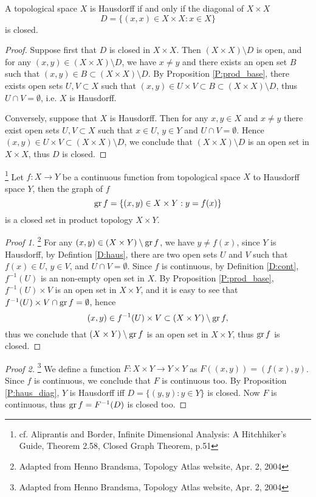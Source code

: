 \begin{proposition} \label{P:haus_diag}
A topological space $X$ is Hausdorff if and only if the diagonal of $X\times X$
\[
	D= \{ (x,x)\in X\times X: x\in X \}
\]
is closed.
\end{proposition}
\begin{proof}
Suppose first that $D$ is closed in $X\times X$. Then $(X\times X)\setminus D$
is open, and for any $(x,y)\in (X\times X)\setminus D$, we have $x\neq y$ and
there exists an open set $B$ such that 
$(x,y)\in B \subset (X\times X)\setminus D$. By Proposition
\ref{P:prod_base}, there exists open sets $U,V\subset X$ such that
$(x,y)\in U\times V \subset B \subset (X\times X)\setminus D$, thus 
$U\cap V=\emptyset$, i.e. $X$ is Hausdorff.

Conversely, suppose that $X$ is Hausdorff. Then for any $x,y\in X$ and $x\neq y$
there exist open sets $U,V\subset X$ such that $x\in U$, $y\in Y$ and 
$U\cap V=\emptyset$. Hence $(x,y)\in U\times V \subset (X\times X)\setminus D$,
we conclude that $(X\times X)\setminus D$ is an open set in $X\times X$, thus
$D$ is closed.
\end{proof}

\begin{lemma} \label{L:haus_graph}
\footnote{cf. Aliprantis and Border, Infinite Dimensional Analysis: A 
	  Hitchhiker's Guide, Theorem 2.58, Closed Graph Theorem, p.51}
Let $f:X\to Y$ be a continuous function from topological space $X$ to Hausdorff 
space $Y$, then the graph of $f$
\[
  \operatorname*{gr} f = \{ (x,y)\in X\times Y : y=f(x) \}
\]
is a closed set in product topology $X\times Y$.
\end{lemma}
\begin{proof}[Proof 1]
\footnote{Adapted from Henno Brandsma, Topology Atlas website, Apr. 2, 2004}
For any $(x,y)\in (X\times Y) \setminus \operatorname*{gr} f$, we have $y\neq f(x)$, since $Y$
is Hausdorff, by Defintion \ref{D:haus}, there are two open sets $U$ and
$V$ such that $f(x)\in U$, $y\in V$, and $U\cap V=\emptyset$.
Since $f$ is continuous, by Definition \ref{D:cont}, $f^{-1}(U)$ is an
non-empty open set in $X$. By Proposition \ref{P:prod_base}, $f^{-1}(U)\times V$
is an open set in $X\times Y$, and it is easy to see that 
$f^{-1}(U)\times V \cap \operatorname*{gr} f=\emptyset$, hence 
\[
  (x,y)\in f^{-1}(U)\times V \subset (X\times Y) \setminus \operatorname*{gr} f,
\]
thus we conclude that $(X\times Y) \setminus \operatorname*{gr} f$ is an open set in 
$X\times Y$, thus $\operatorname*{gr} f$ is closed.
\end{proof}
\begin{proof}[Proof 2]
	\footnote{Adapted from Henno Brandsma, Topology Atlas website, Apr. 2, 2004}
We define a function $F:X\times Y\to Y\times Y$ as $F((x,y))=(f(x),y)$. Since
$f$ is continuous, we conclude that $F$ is continuous too. By Proposition
\ref{P:haus_diag}, $Y$ is Hausdorff iff $D=\{ (y,y):y\in Y \}$ is closed. Now $F$
is continuous, thus $\operatorname*{gr} f=F^{-1}(D)$ is closed too.
\end{proof}

